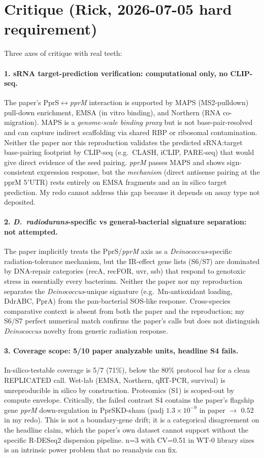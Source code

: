 \documentclass[11pt]{article}
\begin{document}
\section*{Critique (Rick, 2026-07-05 hard requirement)}
Three axes of critique with real teeth:

\paragraph{1. sRNA target-prediction verification: computational only, no CLIP-seq.}
The paper's PprS$\leftrightarrow$\emph{pprM} interaction is supported by MAPS (MS2-pulldown) pull-down enrichment, EMSA (in vitro binding), and Northern (RNA co-migration). MAPS is a \emph{genome-scale binding proxy} but is not base-pair-resolved and can capture indirect scaffolding via shared RBP or ribosomal contamination. Neither the paper nor this reproduction validates the predicted sRNA:target base-pairing footprint by CLIP-seq (e.g.\ CLASH, iCLIP, PARE-seq) that would give direct evidence of the seed pairing. \emph{pprM} passes MAPS and shows sign-consistent expression response, but the \emph{mechanism} (direct antisense pairing at the pprM 5$'$UTR) rests entirely on EMSA fragments and an in silico target prediction. My redo cannot address this gap because it depends on assay type not deposited.

\paragraph{2. \emph{D.\ radiodurans}-specific vs general-bacterial signature separation: not attempted.}
The paper implicitly treats the PprS/\emph{pprM} axis as a \emph{Deinococcus}-specific radiation-tolerance mechanism, but the IR-effect gene lists (S6/S7) are dominated by DNA-repair categories (recA, recFOR, uvr, ssb) that respond to genotoxic stress in essentially every bacterium. Neither the paper nor my reproduction separates the \emph{Deinococcus}-unique signature (e.g.\ Mn-antioxidant loading, DdrABC, PprA) from the pan-bacterial SOS-like response. Cross-species comparative context is absent from both the paper and the reproduction; my S6/S7 perfect numerical match confirms the paper's calls but does not distinguish \emph{Deinococcus} novelty from generic radiation response.

\paragraph{3. Coverage scope: 5/10 paper analyzable units, headline S4 fails.}
In-silico-testable coverage is 5/7 (71\%), below the 80\% protocol bar for a clean REPLICATED call. Wet-lab (EMSA, Northern, qRT-PCR, survival) is unreproducible in silico by construction. Proteomics (S1) is scoped-out by compute envelope. Critically, the failed contrast S4 contains the paper's flagship gene \emph{pprM} down-regulation in PprSKD-sham (padj $1.3\times10^{-9}$ in paper $\to$ $0.52$ in my redo). This is not a boundary-gene drift; it is a categorical disagreement on the headline claim, which the paper's own dataset cannot support without the specific R-DESeq2 dispersion pipeline. n=3 with CV=0.51 in WT-0 library sizes is an intrinsic power problem that no reanalysis can fix.
\end{document}

